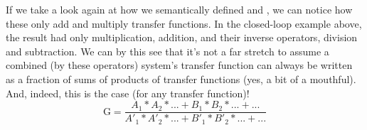 If we take a look again at how we semantically defined \cmd{:->} and \cmd{:>-}, we can notice how these only add and multiply transfer functions. In the closed-loop example above, the result had only multiplication, addition, and their inverse operators, division and subtraction. We can by this see that it's not a far stretch to assume a combined (by these operators) system's transfer function can always be written as a fraction of sums of products of transfer functions (yes, a bit of a mouthful). And, indeed, this is the case (for any transfer function)!
\begin{equation*}
    \text{G} = \frac{A_1*A_2*...+B_1*B_2*...+...}{A'_1*A'_2*...+B'_1*B'_2*...+...}
\end{equation*}




\LNReset